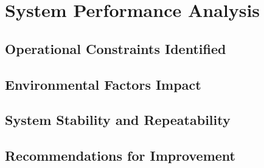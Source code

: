 \section{System Performance Analysis}

\subsection{Operational Constraints Identified}

\subsection{Environmental Factors Impact}



\subsection{System Stability and Repeatability}



\subsection{Recommendations for Improvement}



%

